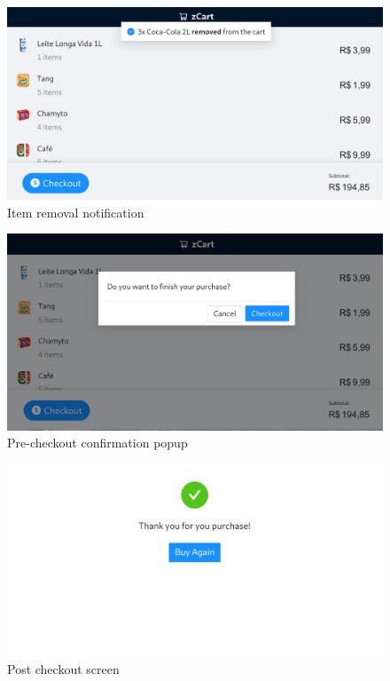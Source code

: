 \documentclass[openright]{normas-utf-tex} %
\begin{document}
\begin{figure}[H]
	\centering
	\includegraphics[width=1\textwidth]{./images/userapp3.png}
	\caption[]{Item removal notification}
\end{figure}

\begin{figure}[H]
	\centering
	\includegraphics[width=1\textwidth]{./images/userapp4.png}
	\caption[]{Pre-checkout confirmation popup}
\end{figure}

\begin{figure}[H]
	\centering
	\includegraphics[width=1\textwidth]{./images/userapp5.png}
	\caption[]{Post checkout screen}
\end{figure}
\end{document}
